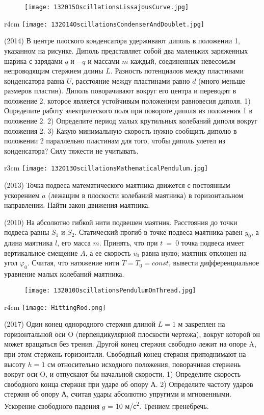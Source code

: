\begin{figure}[!h]
\texttt{[image: 132015OscillationsLissajousCurve.jpg]}
\end{figure}

\begin{wrapfigure}{r}{4cm}
\texttt{[image: 132014OscillationsCondenserAndDoublet.jpg]}
\end{wrapfigure}

\AddProb (2014) В центре плоского конденсатора удерживают диполь в положении 1, указанном на рисунке. 
Диполь представляет собой два маленьких заряженных шарика с зарядами $q$ и $-q$ и массами $m$ каждый, 
соединенных невесомым непроводящим стержнем длины $L$. Разность потенциалов между пластинами конденсатора равна $U$, 
расстояние между пластинами равно $d$ (много меньше размеров пластин). Диполь поворачивают вокруг его центра и переводят в положение 2, 
которое является устойчивым положением равновесия диполя. 
1) Определите работу электрического поля при повороте диполя из положения 1 в положение 2. 
2) Определите период малых крутильных колебаний диполя вокруг положения 2. 
3) Какую минимальную скорость нужно сообщить диполю в положении 2 параллельно пластинам для того, чтобы диполь улетел из конденсатора? 
Силу тяжести не учитывать.


\begin{wrapfigure}{r}{3cm}
\texttt{[image: 132013OscillationsMathematicalPendulum.jpg]}
\end{wrapfigure}

\AddProb (2013) Точка подвеса математического маятника движется с постоянным ускорением $a$ (лежащим в плоскости колебаний маятника) 
в горизонтальном направлении. Найти закон движения маятника.

\AddProb (2010) На абсолютно гибкой нити подвешен маятник. Расстояния до точки подвеса равны $S_1$ и $S_2$. 
Статический прогиб в точке подвеса маятника равен $y_0$, а длина маятника $l$, его масса $m$. 
Принять, что при $t$~=~0 точка подвеса имеет вертикальное смещение $A$, а ее скорость $v_0$ равна нулю; маятник отклонен на угол $\varphi_0$. 
Считая, что натяжение нити $T = T_0 = const$, вывести дифференциальное уравнение малых колебаний маятника.

\begin{figure}[!h]
\texttt{[image: 132010OscillationsPendulumOnThread.jpg]}
\end{figure}

\begin{wrapfigure}{r}{4cm}
\texttt{[image: HittingRod.png]}
\end{wrapfigure}
\AddProb (2017) Один конец однородного стержня длиной $L=1$ м закреплен на горизонтальной оси O (перпендикулярной плоскости чертежа), вокруг которой он может вращаться без трения. Другой конец стержня свободно лежит на опоре A, при этом стержень горизонтали. Свободный конец стержня приподнимают на
высоту $h = 1$ см относительно исходного положения, поворачивая стержень
вокруг оси O, и отпускают бы начальной скорости. 1) Определите скорость
свободного конца стержня при ударе об опору А. 2) Определите частоту ударов
стержня об опору А, считая удары абсолютно упругими и мгновенными.
Ускорение свободного падения $g$ = 10 м/с\textsuperscript{2}. Трением пренебречь.

